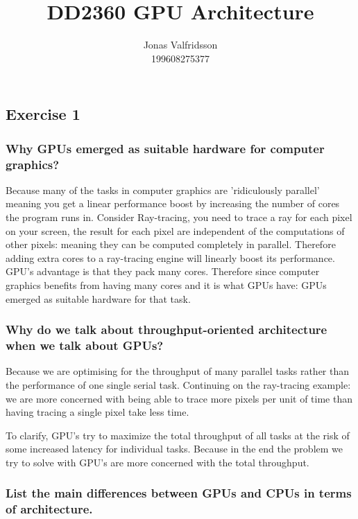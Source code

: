 \documentclass{article}
\title{DD2360 GPU Architecture}
\author{Jonas Valfridsson\\ 199608275377}
\begin{document}
\maketitle

\subsection*{Exercise 1}%
\label{sub:exercise_1}



\subsubsection*{Why GPUs emerged as suitable hardware for computer graphics?}%
\label{ssub:why_gpus_emerged_as_suitable_hardware_for_computer_graphics_e_g_games_}

Because many of the tasks in computer graphics are 'ridiculously parallel' meaning you get a linear performance boost by increasing the number of cores the
program runs in. Consider Ray-tracing, you need to trace a ray for each pixel on your screen, the result for each pixel are independent of the computations
of other pixels: meaning they can be computed completely in parallel. Therefore adding extra cores to a ray-tracing engine will linearly boost its performance.
GPU's advantage is that they pack many cores. Therefore since computer graphics benefits from having many cores and it is what GPUs have: GPUs emerged as suitable
hardware for that task.

\subsubsection*{Why do we talk about throughput-oriented architecture when we talk about GPUs?}%
\label{ssub:_why_do_we_talk_about_throughput_oriented_architecture_when_we_talk_about_gpus_}

Because we are optimising for the throughput of many parallel tasks rather than the performance of one single serial task. Continuing on the ray-tracing example:
we are more concerned with being able to trace more pixels per unit of time than having tracing a single pixel take less time.

To clarify, GPU's try to maximize the total throughput of all tasks at the risk of some increased latency for individual tasks. Because in the end the problem we
try to solve with GPU's are more concerned with the total throughput.

\subsubsection*{List the main differences between GPUs and CPUs in terms of architecture.}%
\label{ssub:}
\end{document}
